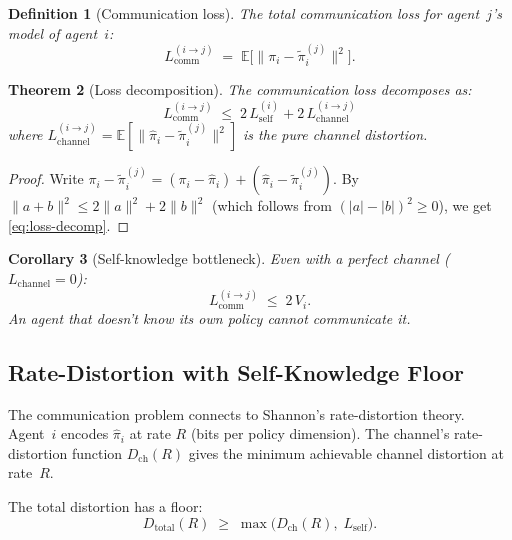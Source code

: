 \documentclass[11pt]{article}
\newtheorem{theorem}{Theorem}[section]
\newtheorem{corollary}[theorem]{Corollary}
\newtheorem{definition}[theorem]{Definition}
\begin{document}
\begin{definition}[Communication loss]
The total communication loss for agent~$j$'s model of agent~$i$:
\begin{equation}
  L_{\text{comm}}^{(i \to j)} \;=\; \mathbb{E}\bigl[\|\pi_i - \tilde{\pi}_i^{(j)}\|^2\bigr].
\end{equation}
\end{definition}

\begin{theorem}[Loss decomposition]\label{thm:loss-decomp}
The communication loss decomposes as:
\begin{equation}\label{eq:loss-decomp}
  L_{\text{comm}}^{(i \to j)} \;\leq\; 2\,L_{\text{self}}^{(i)} + 2\,L_{\text{channel}}^{(i \to j)}
\end{equation}
where $L_{\text{channel}}^{(i \to j)} = \mathbb{E}[\|\hat{\pi}_i - \tilde{\pi}_i^{(j)}\|^2]$
is the pure channel distortion.
\end{theorem}

\begin{proof}
Write $\pi_i - \tilde{\pi}_i^{(j)} = (\pi_i - \hat{\pi}_i) + (\hat{\pi}_i - \tilde{\pi}_i^{(j)})$.
By $\|a + b\|^2 \leq 2\|a\|^2 + 2\|b\|^2$ (which follows from $(|a| - |b|)^2 \geq 0$),
we get \eqref{eq:loss-decomp}.
\end{proof}

\begin{corollary}[Self-knowledge bottleneck]\label{cor:bottleneck}
Even with a perfect channel ($L_{\text{channel}} = 0$):
\begin{equation}
  L_{\text{comm}}^{(i \to j)} \;\leq\; 2\,V_i.
\end{equation}
\emph{An agent that doesn't know its own policy cannot communicate it.}
\end{corollary}

\subsection{Rate-Distortion with Self-Knowledge Floor}

The communication problem connects to Shannon's rate-distortion theory.
Agent~$i$ encodes $\hat{\pi}_i$ at rate $R$ (bits per policy dimension).
The channel's rate-distortion function $D_{\text{ch}}(R)$ gives the minimum
achievable channel distortion at rate~$R$.

The total distortion has a floor:
\begin{equation}\label{eq:rate-distortion}
  D_{\text{total}}(R) \;\geq\; \max\bigl(D_{\text{ch}}(R),\; L_{\text{self}}\bigr).
\end{equation}
\end{document}
